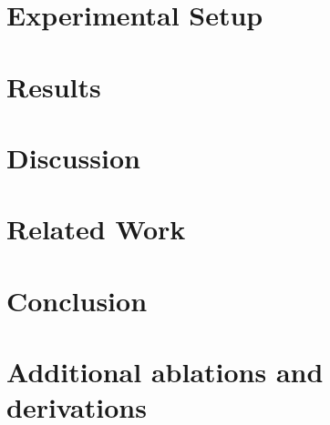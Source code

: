 \documentclass[10pt,a4paper]{article}
\begin{document}
\section{Experimental Setup}
\label{sec:setup}


\section{Results}
\label{sec:results}


\section{Discussion}
\label{sec:discussion}


\section{Related Work}
\label{sec:related}


\section{Conclusion}
\label{sec:conclusion}


\appendix
\section{Additional ablations and derivations}





\end{document}
